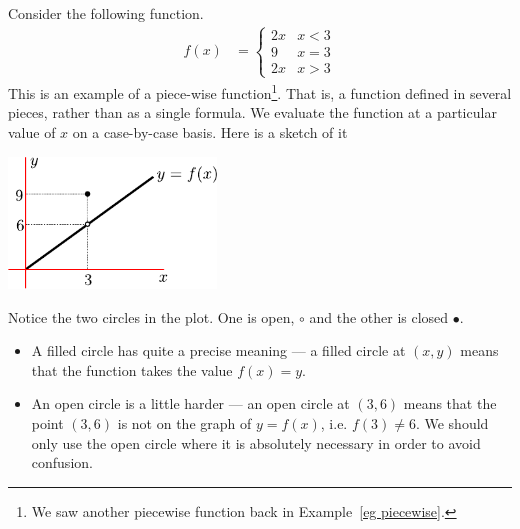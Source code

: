 \begin{eg}
Consider the following function.
\begin{align*}
 f(x) &= \begin{cases}
          2x & x<3 \\
          9 & x=3 \\
          2x & x>3
         \end{cases}
\end{align*}
This is an example of a piece-wise function\footnote{We saw another
piecewise function back in Example~\ref{eg piecewise}.}. That is, a function
defined in several pieces, rather than as a single formula. We evaluate the
function at a particular value of $x$ on a case-by-case basis. Here is a sketch
of it
\begin{efig}
\begin{center}
 \includegraphics[height=35mm]{piecewise1}
\end{center}
\end{efig}
Notice the two circles in the plot. One is open, $\circ$ and the other is
closed $\bullet$.
\begin{itemize}
 \item A filled circle has quite a precise meaning --- a filled circle at
$(x,y)$ means that the function takes the value $f(x) = y$.
 \item An open circle is a little harder --- an open circle at $(3,6)$ means
that the point $(3,6)$ is not on the graph of $y=f(x)$, i.e. $f(3) \neq 6$.
We should only use the open circle where it is absolutely necessary in order to
avoid confusion.
\end{itemize}



\end{eg}
